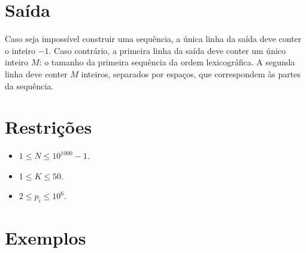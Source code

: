 \section*{Saída}

Caso seja impossível construir uma sequência, a única linha da saída deve conter o inteiro $-1$.
Caso contrário, a primeira linha da saída deve conter um único inteiro $M$: o tamanho da primeira sequência da ordem lexicográfica.
A segunda linha deve conter $M$ inteiros, separados por espaços, que correspondem às partes da sequência.
 

\section*{Restrições}

\begin{itemize}
    \item $1 \leq N \leq 10^{1000} - 1$.
    \item $1 \leq K \leq 50$.
    \item $2 \leq p_i \leq 10^{6}$.
\end{itemize}


\section*{Exemplos}

\exemplo
